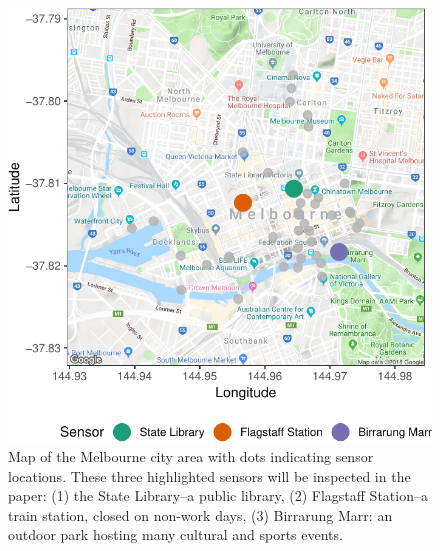 \documentclass[12pt]{article}
\begin{document}
\begin{figure}

{\centering \includegraphics[width=0.7\linewidth]{figure/ped-map-1} 

}

\caption{Map of the Melbourne city area with dots indicating sensor locations. These three highlighted sensors will be inspected in the paper: (1) the State Library--a public library, (2) Flagstaff Station--a train station, closed on non-work days, (3) Birrarung Marr: an outdoor park hosting many cultural and sports events.}\label{fig:ped-map}
\end{figure}
\end{document}
